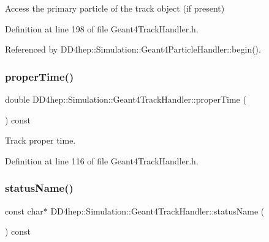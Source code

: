 Access the primary particle of the track object (if present) 



Definition at line 198 of file Geant4\+Track\+Handler.\+h.



Referenced by D\+D4hep\+::\+Simulation\+::\+Geant4\+Particle\+Handler\+::begin().

\hypertarget{class_d_d4hep_1_1_simulation_1_1_geant4_track_handler_a48e9356a58f172abf33d1410d3aa61c2}{}\label{class_d_d4hep_1_1_simulation_1_1_geant4_track_handler_a48e9356a58f172abf33d1410d3aa61c2} 
\subsubsection{\texorpdfstring{proper\+Time()}{properTime()}}
{\footnotesize\ttfamily double D\+D4hep\+::\+Simulation\+::\+Geant4\+Track\+Handler\+::proper\+Time (\begin{DoxyParamCaption}{ }\end{DoxyParamCaption}) const\hspace{0.3cm}{\ttfamily [inline]}}



Track proper time. 



Definition at line 116 of file Geant4\+Track\+Handler.\+h.

\hypertarget{class_d_d4hep_1_1_simulation_1_1_geant4_track_handler_a402c1436c1bbd21912b4eec241825d32}{}\label{class_d_d4hep_1_1_simulation_1_1_geant4_track_handler_a402c1436c1bbd21912b4eec241825d32} 
\subsubsection{\texorpdfstring{status\+Name()}{statusName()}}
{\footnotesize\ttfamily const char$\ast$ D\+D4hep\+::\+Simulation\+::\+Geant4\+Track\+Handler\+::status\+Name (\begin{DoxyParamCaption}{ }\end{DoxyParamCaption}) const\hspace{0.3cm}{\ttfamily [inline]}}



